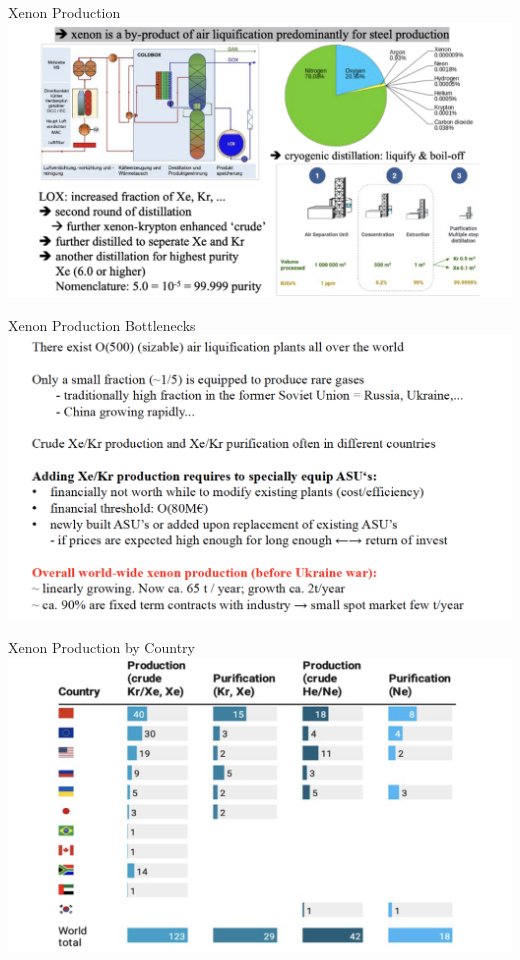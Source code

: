 \documentclass [aspectratio=169]{beamer}
\begin{document}
\begin{frame}{Xenon Production}
\includegraphics[scale=0.30]{xenonprod.png}
\end{frame}

\begin{frame}{Xenon Production Bottlenecks}
\includegraphics[scale=0.30]{xenonbottle.png}
\end{frame}

\begin{frame}{Xenon Production by Country}
\includegraphics[scale=0.30]{asus.png}
\end{frame}
\end{document}
